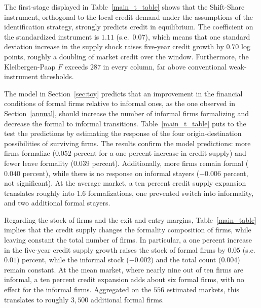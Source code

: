 \documentclass[12pt]{article}
\begin{document}
The first-stage displayed in Table~\ref{main_t_table} shows that the Shift-Share instrument, orthogonal to the local credit demand under the assumptions of the identification strategy, strongly predicts credit in equilibrium. The coefficient on the standardized instrument is $1.11$ (s.e.\ $0.07$), which means that one standard deviation increase in the supply shock raises five-year credit growth by $0.70$ log points, roughly a doubling of market credit over the window. Furthermore, the Kleibergen-Paap $F$ exceeds $287$ in every column, far above conventional weak-instrument thresholds.

\begin{table}[H]
    \caption{Shift-Share IV estimates of the effect of bank shocks on firm transitions}
    \label{main_t_table}
    \centering
    \small
    
\end{table}

The model in Section~\ref{sec:toy} predicts that an improvement in the financial conditions of formal firms relative to informal ones, as the one observed in Section~\ref{annual}, should increase the number of informal firms formalizing and decrease the formal to informal transitions. Table~\ref{main_t_table} puts to the test the predictions by estimating the response of the four origin-destination possibilities of surviving firms. The results confirm the model predictions: more firms formalize ($0.052$ percent for a one percent increase in credit supply) and fewer leave formality ($0.039$ percent). Additionally, more firms remain formal ($0.040$ percent), while there is no response on informal stayers ($-0.006$ percent, not significant). At the average market, a ten percent credit supply expansion translates roughly into $1.6$ formalizations, one prevented switch into informality, and two additional formal stayers.

Regarding the stock of firms and the exit and entry margins, Table~\ref{main_table} implies that the credit supply changes the formality composition of firms, while leaving constant the total number of firms. In particular, a one percent increase in the five-year credit supply growth raises the stock of formal firms by $0.05$ (s.e.\ $0.01$) percent, while the informal stock ($-0.002$) and the total count ($0.004$) remain constant. At the mean market, where nearly nine out of ten firms are informal, a ten percent credit expansion adds about six formal firms, with no effect for the informal firms. Aggregated on the $556$ estimated markets, this translates to roughly $3{,}500$ additional formal firms. 
\end{document}
